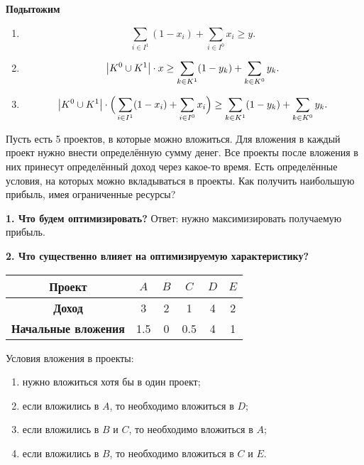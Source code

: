 \textbf{Подытожим}
\begin{enumerate}
	\item {}
	\[
		\sum_{i \in I^1}(1-x_i) + \sum_{i \in I^0}x_i \ge y.
	\]
	
	\item {}
	\[
		\abs{K^0 \cup K^1} \cdot x  \ge \sum_{k \in K^1}(1-y_k) + \sum_{k \in K^0}y_k.
	\]
	
	\item {}
	\[
		\abs{K^0 \cup K^1} \cdot \Big(\sum_{i \in I^1}(1-x_i) + \sum_{i \in I^0}x_i\Big) \ge \sum_{k \in K^1}(1-y_k) + \sum_{k \in K^0}y_k.
	\]
\end{enumerate}

\problem

Пусть есть 5 проектов, в которые можно вложиться. Для вложения в каждый проект нужно внести определённую сумму денег. Все проекты после вложения в них принесут определённый доход через какое-то время. Есть определённые условия, на которых можно вкладываться в проекты. Как получить наибольшую прибыль, имея ограниченные ресурсы?

\textbf{1. Что будем оптимизировать?} Ответ: нужно максимизировать получаемую прибыль.

\textbf{2. Что существенно влияет на оптимизируемую характеристику?}

\begin{table}[h!]
	\centering
	\begin{tabular}{| c | c | c | c | c | c |} 
		\hline
		\textbf{Проект}             & $A$ & $B$ & $C$ & $D$ & $E$ \\\hline
		\textbf{Доход}              & 3   & 2   & 1   & 4   & 2 \\\hline
		\textbf{Начальные вложения} & 1.5 & 0   & 0.5 & 4   & 1 \\\hline
	\end{tabular}
\end{table}

Условия вложения в проекты:
\begin{enumerate}[nosep]
	\item нужно вложиться хотя бы в один проект;
	
	\item если вложились в $A$, то необходимо вложиться в $D$;
	
	\item если вложились в $B$ и $C$, то необходимо вложиться в $A$;
	
	\item если вложились в $B$, то необходимо вложиться в $C$ и $E$.
\end{enumerate}

